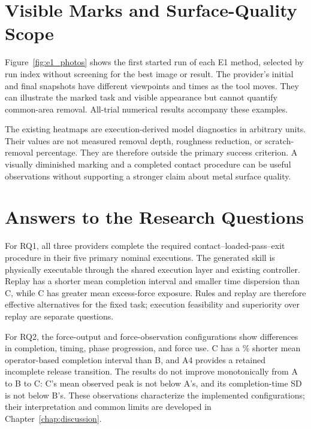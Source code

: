 \section{Visible Marks and Surface-Quality Scope}
Figure~\ref{fig:e1_photos} shows the first started run of each E1 method, selected by run index without screening for the best image or result. The provider's initial and final snapshots have different viewpoints and times as the tool moves. They can illustrate the marked task and visible appearance but cannot quantify common-area removal. All-trial numerical results accompany these examples.



The existing heatmaps are execution-derived model diagnostics in arbitrary units. Their values are not measured removal depth, roughness reduction, or scratch-removal percentage. They are therefore outside the primary success criterion. A visually diminished marking and a completed contact procedure can be useful observations without supporting a stronger claim about metal surface quality.

\section{Answers to the Research Questions}
For RQ1, all three providers complete the required contact--loaded-pass--exit procedure in their five primary nominal executions. The generated skill is physically executable through the shared execution layer and existing controller. Replay has a shorter mean completion interval and smaller time dispersion than C, while C has greater mean excess-force exposure. Rules and replay are therefore effective alternatives for the fixed task; execution feasibility and superiority over replay are separate questions.

For RQ2, the force-output and force-observation configurations show differences in completion, timing, phase progression, and force use. C has a \BCPercent\% shorter mean operator-based completion interval than B, and A4 provides a retained incomplete release transition. The results do not improve monotonically from A to B to C: C's mean observed peak is not below A's, and its completion-time SD is not below B's. These observations characterize the implemented configurations; their interpretation and common limits are developed in Chapter~\ref{chap:discussion}.
